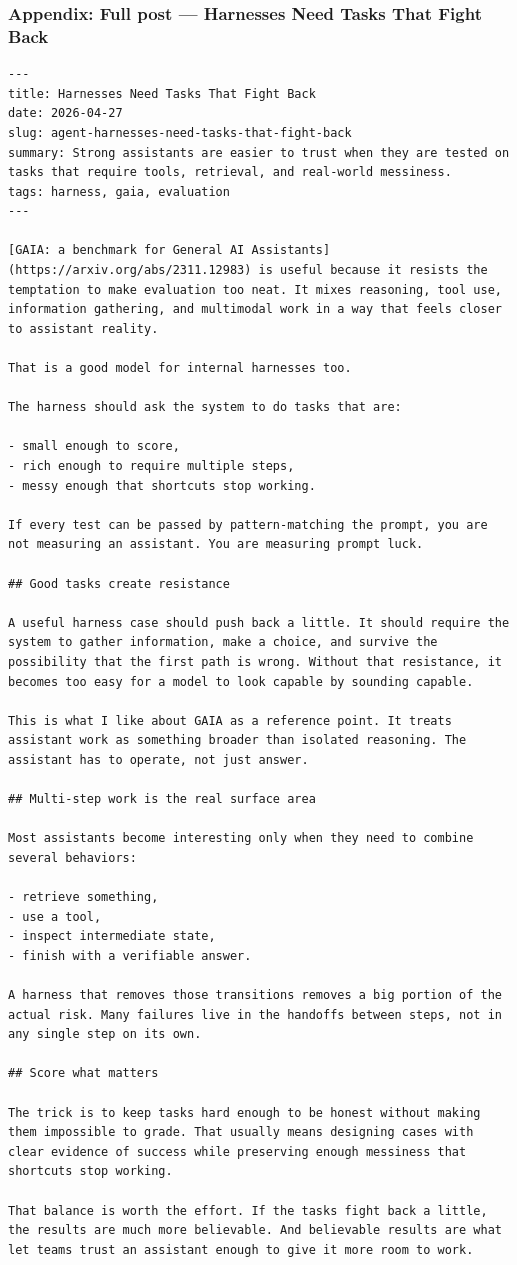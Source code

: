 \documentclass[aspectratio=169]{beamer}
\begin{document}
\begin{frame}[fragile]
\frametitle{Appendix: Full post — Harnesses Need Tasks That Fight Back}
\begin{verbatim}
---
title: Harnesses Need Tasks That Fight Back
date: 2026-04-27
slug: agent-harnesses-need-tasks-that-fight-back
summary: Strong assistants are easier to trust when they are tested on tasks that require tools, retrieval, and real-world messiness.
tags: harness, gaia, evaluation
---

[GAIA: a benchmark for General AI Assistants](https://arxiv.org/abs/2311.12983) is useful because it resists the temptation to make evaluation too neat. It mixes reasoning, tool use, information gathering, and multimodal work in a way that feels closer to assistant reality.

That is a good model for internal harnesses too.

The harness should ask the system to do tasks that are:

- small enough to score,
- rich enough to require multiple steps,
- messy enough that shortcuts stop working.

If every test can be passed by pattern-matching the prompt, you are not measuring an assistant. You are measuring prompt luck.

## Good tasks create resistance

A useful harness case should push back a little. It should require the system to gather information, make a choice, and survive the possibility that the first path is wrong. Without that resistance, it becomes too easy for a model to look capable by sounding capable.

This is what I like about GAIA as a reference point. It treats assistant work as something broader than isolated reasoning. The assistant has to operate, not just answer.

## Multi-step work is the real surface area

Most assistants become interesting only when they need to combine several behaviors:

- retrieve something,
- use a tool,
- inspect intermediate state,
- finish with a verifiable answer.

A harness that removes those transitions removes a big portion of the actual risk. Many failures live in the handoffs between steps, not in any single step on its own.

## Score what matters

The trick is to keep tasks hard enough to be honest without making them impossible to grade. That usually means designing cases with clear evidence of success while preserving enough messiness that shortcuts stop working.

That balance is worth the effort. If the tasks fight back a little, the results are much more believable. And believable results are what let teams trust an assistant enough to give it more room to work.
\end{verbatim}
\end{frame}
\end{document}
